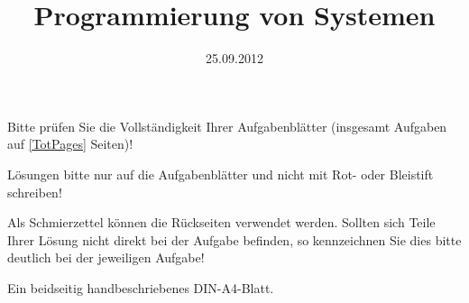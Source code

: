 \documentclass{uulm-exam}
\begin{document}
\title{Programmierung von Systemen}
\date{25.09.2012}

\begin{hints}
\begin{hintslist}
\item Bitte prüfen Sie die Vollständigkeit Ihrer Aufgabenblätter
(insgesamt \gettotalassignments{} Aufgaben auf  \ref{TotPages} Seiten)!
\item Lösungen bitte nur auf die Aufgabenblätter und nicht mit Rot- oder
Bleistift schreiben!
\item Als Schmierzettel können die Rückseiten verwendet werden.
Sollten sich Teile Ihrer Lösung nicht direkt bei der Aufgabe befinden, so
kennzeichnen Sie dies bitte deutlich bei der jeweiligen Aufgabe!
\end{hintslist}
\end{hints}

\begin{tools}
Ein beidseitig handbeschriebenes DIN-A4-Blatt.
\end{tools}

\maketitle

\graphicspath{{aufgaben/img/}}

\begin{assignments}

\end{assignments}


% 
\end{document}
